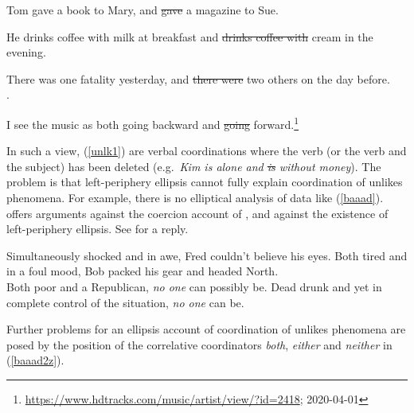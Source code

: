 {
\begin{exe}
\ex
\begin{xlista}
\ex Tom gave a book to Mary, and \sout{gave} a magazine to Sue. 

\ex He drinks coffee with milk at breakfast and \sout{drinks coffee with} cream in the evening.\\ \citep[]{hudson84}

\ex There was one fatality yesterday, and \sout{there were} two others on the day
before.\\
\citep[339]{chavesthesis}.

\ex I see the music as both going backward and \sout{going} forward.\footnote{
\url{https://www.hdtracks.com/music/artist/view/?id=2418}; 2020-04-01}
\end{xlista}\label{unlk}
\end{exe}

\noindent
In such a view, (\ref{unlk1})  are verbal coordinations where the verb (or the verb and the subject) has been deleted  (e.g.\ \emph{Kim is alone and \sout{is} without money}).  The problem is that  left-periphery ellipsis  cannot  fully explain 
coordination of unlikes phenomena. For example, there is no elliptical analysis of  data like (\ref{baaad}). \citet{levine11} offers  arguments against
the coercion account of \citet{chaves06},
and against  the existence of left-periphery ellipsis. See \cite{yatabe12} for a reply.

\begin{exe}
\ex
\begin{xlista}
\ex Simultaneously shocked and in awe, Fred couldn't believe his eyes.
\ex  Both tired and in a foul mood, Bob packed his gear and headed North.\\
\citep[]{chaves06}
\ex Both poor and a Republican, \emph{no one} can possibly be.
\ex  Dead drunk and yet in complete control of the situation, \emph{no one} can be.\\
\citep[]{levine11}
\end{xlista}\label{baaad}
\end{exe}



\noindent
Further problems for an  ellipsis account of coordination
of unlikes phenomena are posed by the position of  the 
correlative coordinators \emph{both}, \emph{either} and
 \emph{neither} in (\ref{baaad2z}).

}
